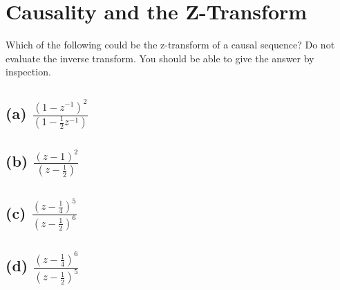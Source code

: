 \documentclass[11pt]{article}
\begin{document}
\section{Causality and the Z-Transform}
Which of the following could be the z-transform of a causal sequence? Do not evaluate the inverse transform. You should be able to give the answer by inspection.


\subsection*{(a) $\frac{(1-z^{-1})^2}{(1-\frac{1}{2}z^{-1})}$}


\subsection*{(b) $\frac{(z-1)^2}{(z-\frac{1}{2})}$}


\subsection*{(c) $ \frac{(z-\frac{1}{4})^5}{(z-\frac{1}{2})^6}$}


\subsection*{(d) $ \frac{(z-\frac{1}{4})^6}{(z-\frac{1}{2})^5}$}

\end{document}
